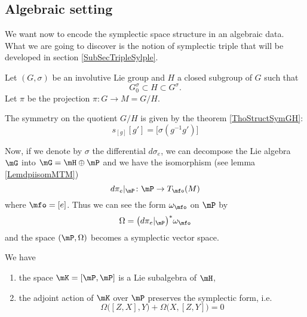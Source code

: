 \subsection{Algebraic setting}

We want now to encode the symplectic space structure in an algebraic data. What we are going to discover is the notion of symplectic triple that will be developed in section \ref{SubSecTripleSylple}.

Let $(G,\sigma)$ be an involutive Lie group and $H$ a closed subgroup of $G$ such that
\begin{equation}
	G_0^{\sigma}\subset H\subset G^{\sigma}.
\end{equation}
Let $\pi$ be the projection $\pi\colon G\to M=G/H$. 

The symmetry on the quotient $G/H$ is given by the theorem \ref{ThoStructSymGH}:
\begin{equation}		\label{EaSymGH}
	s_{[g]}[g']=\big[ \sigma(g^{-1}g') \big]
\end{equation}

Now, if we denote by $\sigma$ the differential $d\sigma_e$, we can decompose the Lie algebra $\mG$ into $\mG=\mH\oplus\mP$ and we have the isomorphism (see lemma \ref{LemdpiisomMTM})
\begin{equation}
	d\pi_e|_{\mP}\colon \mP\to T_{\mfo}(M)
\end{equation}
where $\mfo=[e]$. Thus we can see the form $\omega_{\mfo}$ on $\mP$ by
\begin{equation}
	\Omega=\big( d\pi_e|_{\mP} \big)^*\omega_{\mfo}
\end{equation}
and the space $(\mP,\Omega)$ becomes a symplectic vector space.

\begin{lemma}
	We have
	\begin{enumerate}

		\item
			the space $\mK=[\mP,\mP]$ is a Lie subalgebra of $\mH$,

		\item
			the adjoint action of $\mK$ over $\mP$ preserves the symplectic form, i.e.
			\begin{equation}
				\Omega\big( [Z,X],Y \big)+\Omega\big( X,[Z,Y] \big)=0
			\end{equation}

	\end{enumerate}
	
\end{lemma}

